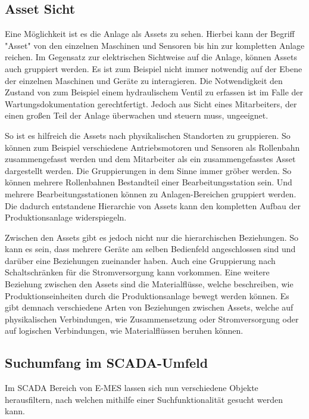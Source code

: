 \subsection{Asset Sicht\label{subsec3.1.2:Unterunterpunkt-2}}
Eine Möglichkeit ist es die Anlage als Assets zu sehen. Hierbei kann der Begriff "Asset" von den einzelnen Maschinen und Sensoren bis hin zur kompletten Anlage reichen. Im Gegensatz zur elektrischen Sichtweise auf die Anlage, können Assets auch gruppiert werden. Es ist zum Beispiel nicht immer notwendig auf der Ebene der einzelnen Maschinen und Geräte zu interagieren. Die Notwendigkeit den Zustand von zum Beispiel einem hydraulischem Ventil zu erfassen ist im Falle der Wartungsdokumentation gerechtfertigt. Jedoch aus Sicht eines Mitarbeiters, der einen großen Teil der Anlage überwachen und steuern muss, ungeeignet.

So ist es hilfreich die Assets nach physikalischen Standorten zu gruppieren. So können zum Beispiel verschiedene Antriebsmotoren und Sensoren als Rollenbahn zusammengefasst werden und dem Mitarbeiter als ein zusammengefasstes Asset dargestellt werden. Die Gruppierungen in dem Sinne immer gröber werden. So können mehrere Rollenbahnen Bestandteil einer Bearbeitungsstation sein. Und mehrere Bearbeitungsstationen können zu Anlagen-Bereichen gruppiert werden. Die dadurch entstandene Hierarchie von Assets kann den kompletten Aufbau der Produktionsanlage widerspiegeln.

Zwischen den Assets gibt es jedoch nicht nur die hierarchischen Beziehungen. So kann es sein, dass mehrere Geräte am selben Bedienfeld angeschlossen sind und darüber eine Beziehungen zueinander haben. Auch eine Gruppierung nach Schaltschränken für die Stromversorgung kann vorkommen. Eine weitere Beziehung zwischen den Assets sind die Materialflüsse, welche beschreiben, wie Produktionseinheiten durch die Produktionsanlage bewegt werden können. Es gibt demnach verschiedene Arten von Beziehungen zwischen Assets, welche auf physikalischen Verbindungen, wie Zusammensetzung oder Stromversorgung oder auf logischen Verbindungen, wie Materialflüssen beruhen können.

\subsection{Suchumfang im SCADA-Umfeld\label{subsec3.1.3:Unterunterpunkt-3}}
Im SCADA Bereich von E-MES lassen sich nun verschiedene Objekte herausfiltern, nach welchen mithilfe einer Suchfunktionalität gesucht werden kann.

